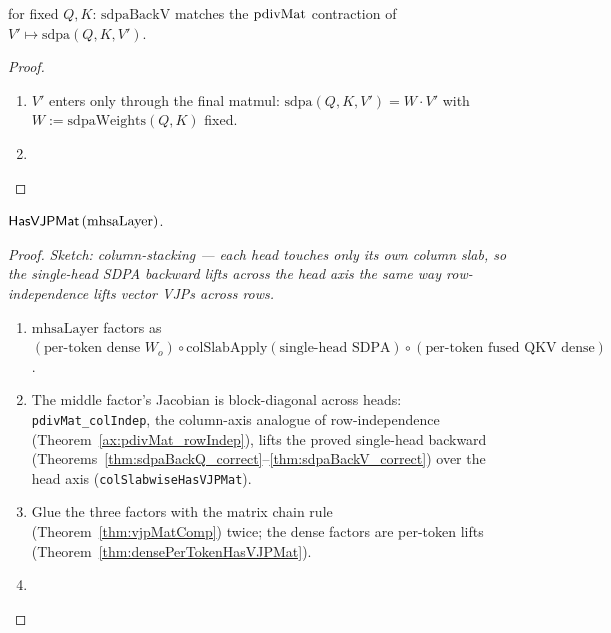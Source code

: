 \begin{theorem}
  \label{thm:sdpaBackV_correct}
  \leanok
  \Prove{} for fixed \(Q, K\): \(\mathrm{sdpaBackV}\) matches the
  \(\operatorname{pdivMat}\) contraction of \(V' \mapsto \mathrm{sdpa}(Q, K, V')\).
\end{theorem}

\begin{proof}
\leanok
\begin{enumerate}
  \item \(V'\) enters only through the final matmul:
    \(\mathrm{sdpa}(Q, K, V') = W \cdot V'\) with
    \(W := \mathrm{sdpaWeights}(Q, K)\) fixed.
  \item \Qed{}
\end{enumerate}
\end{proof}

\begin{theorem}
  \label{ax:mhsaHasVJPMat}
  \leanok
  \Prove{} \(\mathsf{HasVJPMat}\, (\mathrm{mhsaLayer})\).
\end{theorem}

\begin{proof}
\leanok
\emph{Sketch: column-stacking --- each head touches only its own
column slab, so the single-head SDPA backward lifts across the head
axis the same way row-independence lifts vector VJPs across rows.}
\begin{enumerate}
  \item \(\mathrm{mhsaLayer}\) factors as
    \((\text{per-token dense } W_o) \circ
      \mathrm{colSlabApply}(\text{single-head SDPA}) \circ
      (\text{per-token fused QKV dense})\).
  \item The middle factor's Jacobian is block-diagonal across heads:
    \texttt{pdivMat\_colIndep}, the column-axis analogue of
    row-independence (Theorem~\ref{ax:pdivMat_rowIndep}), lifts the
    proved single-head backward
    (Theorems~\ref{thm:sdpaBackQ_correct}--\ref{thm:sdpaBackV_correct})
    over the head axis (\texttt{colSlabwiseHasVJPMat}).
  \item Glue the three factors with the matrix chain rule
    (Theorem~\ref{thm:vjpMatComp}) twice; the dense factors are
    per-token lifts (Theorem~\ref{thm:densePerTokenHasVJPMat}).
  \item \Qed{}
\end{enumerate}
\end{proof}


